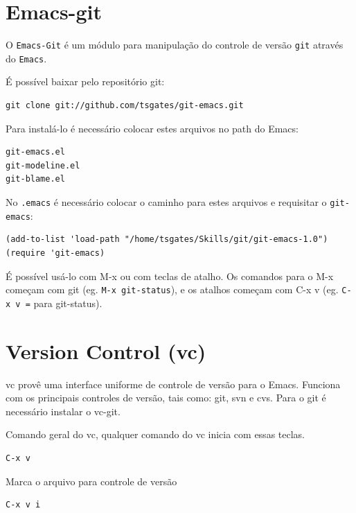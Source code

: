 \documentclass[12pt,brazil]{book}
\begin{document}
\section{Emacs-git}
\label{sec:emacs-git}

O \texttt{Emacs-Git} é um módulo para manipulação do controle de
versão \texttt{git} através do \texttt{Emacs}.

É possível baixar pelo repositório git:

\begin{verbatim}
git clone git://github.com/tsgates/git-emacs.git
\end{verbatim}

Para instalá-lo é necessário colocar estes arquivos no path do Emacs:

\begin{verbatim}
git-emacs.el
git-modeline.el
git-blame.el
\end{verbatim}

No \texttt{.emacs} é necessário colocar o caminho para estes arquivos
e requisitar o \texttt{git-emacs}:
\begin{verbatim}
(add-to-list 'load-path "/home/tsgates/Skills/git/git-emacs-1.0")
(require 'git-emacs)
\end{verbatim}

É possível usá-lo com M-x ou com teclas de atalho. Os comandos para o
M-x começam com git (eg. \texttt{M-x git-status}), e os atalhos
começam com C-x v (eg. \texttt{C-x v =} para git-status).

\section{Version Control (vc)}
\label{sec:vc}

vc provê uma interface uniforme de controle de versão para o Emacs. Funciona
com os principais controles de versão, tais como: git, svn e cvs. Para o
git é necessário instalar o vc-git.

Comando geral do vc, qualquer comando do vc inicia com essas teclas.
\begin{verbatim}                                                   
C-x v 
\end{verbatim}

Marca o arquivo para controle de versão
\begin{verbatim}                                                                                                
C-x v i                                                                                                
\end{verbatim}
\end{document}
